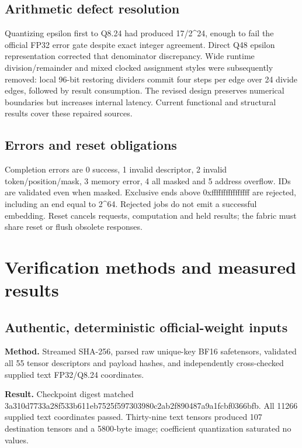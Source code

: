 \documentclass[11pt,a4paper]{article}
\begin{document}
\subsection{Arithmetic defect resolution}

Quantizing epsilon first to Q8.24 had produced 17/\allowbreak{}2\textasciicircum{}24,\allowbreak{} enough to fail the official FP32 error gate despite exact integer agreement. Direct Q48 epsilon representation corrected that denominator discrepancy. Wide runtime division/\allowbreak{}remainder and mixed clocked assignment styles were subsequently removed: local 96-bit restoring dividers commit four steps per edge over 24 divide edges,\allowbreak{} followed by result consumption. The revised design preserves numerical boundaries but increases internal latency. Current functional and structural results cover these repaired sources.

\subsection{Errors and reset obligations}

Completion errors are 0 success,\allowbreak{} 1 invalid descriptor,\allowbreak{} 2 invalid token/\allowbreak{}position/\allowbreak{}mask,\allowbreak{} 3 memory error,\allowbreak{} 4 all masked and 5 address overflow. IDs are validated even when masked. Exclusive ends above 0xffffffffffffffff are rejected,\allowbreak{} including an end equal to 2\textasciicircum{}64. Rejected jobs do not emit a successful embedding. Reset cancels requests,\allowbreak{} computation and held results; the fabric must share reset or flush obsolete responses.

\section{Verification methods and measured results}

\subsection{Authentic,\allowbreak{} deterministic official-weight inputs}

\textbf{Method.} Streamed SHA-256,\allowbreak{} parsed raw unique-key BF16 safetensors,\allowbreak{} validated all 55 tensor descriptors and payload hashes,\allowbreak{} and independently cross-checked supplied text FP32/\allowbreak{}Q8.24 coordinates.

\textbf{Result.} Checkpoint digest matched 3a310d77\allowbreak{}33a28f53\allowbreak{}3b611eb7\allowbreak{}525f5973\allowbreak{}03980c2a\allowbreak{}b2f89048\allowbreak{}7a9a1fcb\allowbreak{}f0366bfb. All 11266 supplied text coordinates passed. Thirty-nine text tensors produced 107 destination tensors and a 5800-byte image; coefficient quantization saturated no values.
\end{document}
